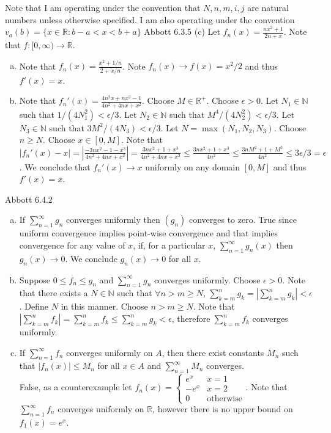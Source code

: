 \documentclass[12pt]{article}
\makeatletter
\theoremstyle{homework}
\newenvironment{exercise}[1]
{\def\@currentlabel{#1}\exercisecore}
{\endexercisecore}
\makeatother
\begin{document}
Note that I am operating under the convention that $N,n,m,i,j$ are natural numbers unless otherwise specified.  I am also operating under the convention $v_a(b)=\{x\in\mathbb{R}:b-a<x<b+a\}$
\begin{exercise}
1
Abbott 6.3.5 (c)
\end{exercise}
Let $f_n(x)=\frac{nx^2+1}{2n+x}$.  Note that $f:[0,\infty)\rightarrow \mathbb{R}$.
\begin{enumerate}[(a)]
\item
Note that $f_n(x)=\frac{x^2+1/n}{2+x/n}$.  Note $f_n(x)\rightarrow f(x)= x^2/2$ and thus $f'(x)=x$.
\item
Note that $f_n'(x)=\frac{4n^2x+nx^2-1}{4n^2+4nx+x^2}$.  Choose $M\in\mathbb{R}^+$.  Choose $\epsilon>0$.  Let $N_1\in\mathbb{N}$ such that $1/(4N_1^2)<\epsilon/3$.  Let $N_2\in\mathbb{N}$ such that $M^4/(4N_2^2)<\epsilon/3$.  Let $N_3\in\mathbb{N}$ such that $3M^2/(4N_3)<\epsilon/3$.  Let $N=\max(N_1,N_2,N_3)$.  Choose $n\geq N$.  Choose $x\in[0,M]$.  Note that $|f_n'(x)-x|=|\frac{-3nx^2-1-x^3}{4n^2+4nx+x^2}|=\frac{3nx^2+1+x^3}{4n^2+4nx+x^2}\leq \frac{3nx^2+1+x^3}{4n^2}\leq \frac{3nM^2+1+M^3}{4n^2}\leq 3\epsilon/3=\epsilon$.  We conclude that $f_n'(x)\rightarrow x$ uniformly on any domain $[0,M]$ and thus $f'(x)=x$.
\end{enumerate}
\begin{exercise}
2
Abbott 6.4.2
\end{exercise}
\begin{enumerate}[(a)]
\item
If $\sum_{n=1}^\infty g_n$ converges uniformly then $(g_n)$ converges to zero.  True since uniform convergence implies point-wise convergence and that implies convergence for any value of $x$, if, for a particular $x$, $\sum_{n=1}^\infty g_n(x)$ then $g_n(x)\rightarrow 0$.  We conclude $g_n(x)\rightarrow 0$ for all $x$.
\item
Suppose $0\leq f_n\leq g_n$ and $\sum_{n=1}^\infty g_n$ converges uniformly.  Choose $\epsilon>0$.  Note that there exists a $N\in\mathbb{N}$ such that $\forall n>m\geq N$, $\sum_{k=m}^n g_k=|\sum_{k=m}^n g_k|<\epsilon$.  Define $N$ in this manner.  Choose $n>m\geq N$.  Note that $|\sum_{k=m}^n f_k|=\sum_{k=m}^n f_k\leq \sum_{k=m}^n g_k<\epsilon$, therefore $\sum_{k=m}^n f_k$ converges uniformly.
\item
If $\sum_{n=1}^\infty f_n$ converges uniformly on $A$, then there exist constants $M_n$ such that $|f_n(x)|\le M_n$ for all $x \in A$ and $\sum_{n=1}^\infty M_n$ converges.\\
False, as a counterexample let $f_n(x)=\begin{cases} e^x & x=1\\ -e^x & x=2\\ 0 & \text{otherwise} \end{cases}$.  Note that $\sum_{n=1}^\infty f_n$ converges uniformly on $\mathbb{R}$, however there is no upper bound on $f_1(x)=e^x$.
\end{enumerate}
\end{document}
